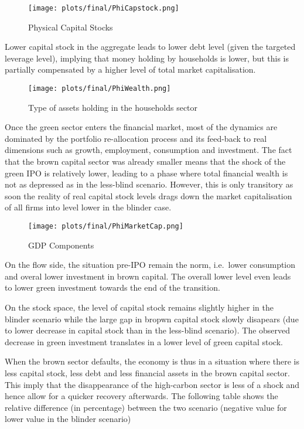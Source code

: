 \documentclass[]{article}
\begin{document}
\begin{figure}[htbp]
\centering
\texttt{[image: plots/final/PhiCapstock.png]}
\caption{Physical Capital Stocks}
\end{figure}

Lower capital stock in the aggregate leads to lower debt level (given
the targeted leverage level), implying that money holding by households
is lower, but this is partially compensated by a higher level of total
market capitalisation.

\begin{figure}[htbp]
\centering
\texttt{[image: plots/final/PhiWealth.png]}
\caption{Type of assets holding in the households sector}
\end{figure}

Once the green sector enters the financial market, most of the dynamics
are dominated by the portfolio re-allocation process and its feed-back
to real dimensions such as growth, employment, consumption and
investment. The fact that the brown capital sector was already smaller
means that the shock of the green IPO is relatively lower, leading to a
phase where total financial wealth is not as depressed as in the
less-blind scenario. However, this is only transitory as soon the
reality of real capital stock levels drags down the market
capitalisation of all firms into level lower in the blinder case.

\begin{figure}[htbp]
\centering
\texttt{[image: plots/final/PhiMarketCap.png]}
\caption{GDP Components}
\end{figure}

On the flow side, the situation pre-IPO remain the norm, i.e.~lower
consumption and overal lower investment in brown capital. The overall
lower level even leads to lower green investment towards the end of the
transition.

On the stock space, the level of capital stock remains slightly higher
in the blinder scenario while the large gap in bropwn capital stock
slowly disapears (due to lower decrease in capital stock than in the
less-blind scenario). The observed decrease in green investment
translates in a lower level of green capital stock.

When the brown sector defaults, the economy is thus in a situation where
there is less capital stock, less debt and less financial assets in the
brown capital sector. This imply that the disappearance of the
high-carbon sector is less of a shock and hence allow for a quicker
recovery afterwards. The following table shows the relative difference
(in percentage) between the two scenario (negative value for lower value
in the blinder scenario)
\end{document}
